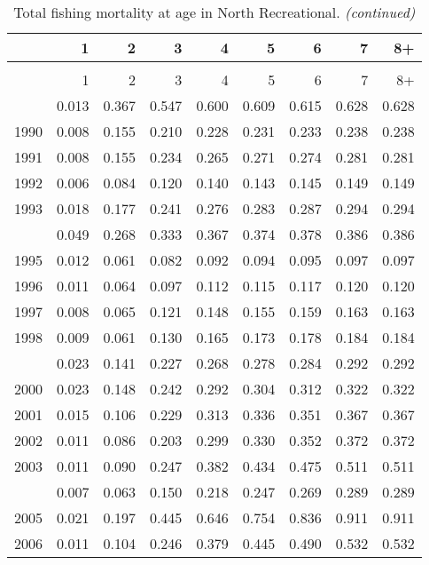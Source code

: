 \documentclass[
]{article}
\begin{document}
\begin{longtable}[t]{lrrrrrrrr}
\caption{\label{tab:North_Recreational-fleet-FAA-table}Total fishing mortality at age in North Recreational.}\\
\toprule
  & 1 & 2 & 3 & 4 & 5 & 6 & 7 & 8+\\
\midrule
\endfirsthead
\caption[]{Total fishing mortality at age in North Recreational. \textit{(continued)}}\\
\toprule
  & 1 & 2 & 3 & 4 & 5 & 6 & 7 & 8+\\
\midrule
\endhead

\endfoot
\bottomrule
\endlastfoot
1989 & 0.013 & 0.367 & 0.547 & 0.600 & 0.609 & 0.615 & 0.628 & 0.628\\
1990 & 0.008 & 0.155 & 0.210 & 0.228 & 0.231 & 0.233 & 0.238 & 0.238\\
1991 & 0.008 & 0.155 & 0.234 & 0.265 & 0.271 & 0.274 & 0.281 & 0.281\\
1992 & 0.006 & 0.084 & 0.120 & 0.140 & 0.143 & 0.145 & 0.149 & 0.149\\
1993 & 0.018 & 0.177 & 0.241 & 0.276 & 0.283 & 0.287 & 0.294 & 0.294\\
\addlinespace
1994 & 0.049 & 0.268 & 0.333 & 0.367 & 0.374 & 0.378 & 0.386 & 0.386\\
1995 & 0.012 & 0.061 & 0.082 & 0.092 & 0.094 & 0.095 & 0.097 & 0.097\\
1996 & 0.011 & 0.064 & 0.097 & 0.112 & 0.115 & 0.117 & 0.120 & 0.120\\
1997 & 0.008 & 0.065 & 0.121 & 0.148 & 0.155 & 0.159 & 0.163 & 0.163\\
1998 & 0.009 & 0.061 & 0.130 & 0.165 & 0.173 & 0.178 & 0.184 & 0.184\\
\addlinespace
1999 & 0.023 & 0.141 & 0.227 & 0.268 & 0.278 & 0.284 & 0.292 & 0.292\\
2000 & 0.023 & 0.148 & 0.242 & 0.292 & 0.304 & 0.312 & 0.322 & 0.322\\
2001 & 0.015 & 0.106 & 0.229 & 0.313 & 0.336 & 0.351 & 0.367 & 0.367\\
2002 & 0.011 & 0.086 & 0.203 & 0.299 & 0.330 & 0.352 & 0.372 & 0.372\\
2003 & 0.011 & 0.090 & 0.247 & 0.382 & 0.434 & 0.475 & 0.511 & 0.511\\
\addlinespace
2004 & 0.007 & 0.063 & 0.150 & 0.218 & 0.247 & 0.269 & 0.289 & 0.289\\
2005 & 0.021 & 0.197 & 0.445 & 0.646 & 0.754 & 0.836 & 0.911 & 0.911\\
2006 & 0.011 & 0.104 & 0.246 & 0.379 & 0.445 & 0.490 & 0.532 & 0.532\\

\end{longtable}
\end{document}
